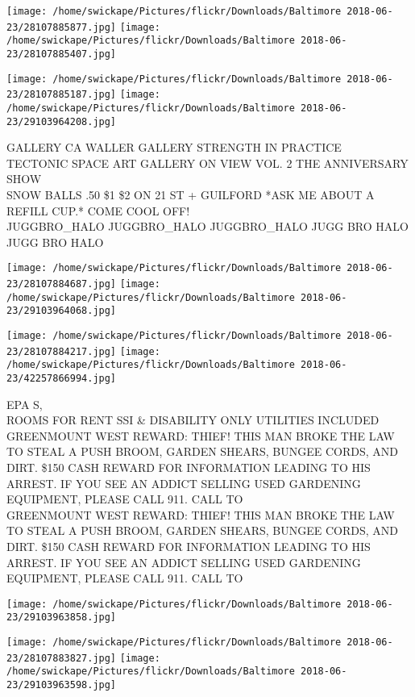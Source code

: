 \documentclass[10pt,letterpaper]{article}
\begin{document}
\texttt{[image: /home/swickape/Pictures/flickr/Downloads/Baltimore 2018-06-23/28107885877.jpg]}
\texttt{[image: /home/swickape/Pictures/flickr/Downloads/Baltimore 2018-06-23/28107885407.jpg]}

\texttt{[image: /home/swickape/Pictures/flickr/Downloads/Baltimore 2018-06-23/28107885187.jpg]}
\texttt{[image: /home/swickape/Pictures/flickr/Downloads/Baltimore 2018-06-23/29103964208.jpg]}

GALLERY CA WALLER GALLERY STRENGTH IN PRACTICE\\
TECTONIC SPACE ART GALLERY ON VIEW VOL. 2 THE ANNIVERSARY SHOW\\
SNOW BALLS .50 \$1 \$2 ON 21 ST + GUILFORD *ASK ME ABOUT A REFILL CUP.* COME COOL OFF!\\
JUGGBRO\_HALO JUGGBRO\_HALO JUGGBRO\_HALO JUGG BRO HALO JUGG BRO HALO\\
\pagebreak

\texttt{[image: /home/swickape/Pictures/flickr/Downloads/Baltimore 2018-06-23/28107884687.jpg]}
\texttt{[image: /home/swickape/Pictures/flickr/Downloads/Baltimore 2018-06-23/29103964068.jpg]}

\texttt{[image: /home/swickape/Pictures/flickr/Downloads/Baltimore 2018-06-23/28107884217.jpg]}
\texttt{[image: /home/swickape/Pictures/flickr/Downloads/Baltimore 2018-06-23/42257866994.jpg]}

EPA S,\\
ROOMS FOR RENT SSI \& DISABILITY ONLY UTILITIES INCLUDED\\
GREENMOUNT WEST REWARD: THIEF!  THIS MAN BROKE THE LAW TO STEAL A PUSH BROOM, GARDEN SHEARS, BUNGEE CORDS, AND DIRT.  \$150 CASH REWARD FOR INFORMATION LEADING TO HIS ARREST.  IF YOU SEE AN ADDICT SELLING USED GARDENING EQUIPMENT, PLEASE CALL 911.  CALL TO\\
GREENMOUNT WEST REWARD: THIEF!  THIS MAN BROKE THE LAW TO STEAL A PUSH BROOM, GARDEN SHEARS, BUNGEE CORDS, AND DIRT.  \$150 CASH REWARD FOR INFORMATION LEADING TO HIS ARREST.  IF YOU SEE AN ADDICT SELLING USED GARDENING EQUIPMENT, PLEASE CALL 911.  CALL TO\\
\pagebreak

\texttt{[image: /home/swickape/Pictures/flickr/Downloads/Baltimore 2018-06-23/29103963858.jpg]}

\vspace{0.25in}
\texttt{[image: /home/swickape/Pictures/flickr/Downloads/Baltimore 2018-06-23/28107883827.jpg]}
\texttt{[image: /home/swickape/Pictures/flickr/Downloads/Baltimore 2018-06-23/29103963598.jpg]}
\end{document}

